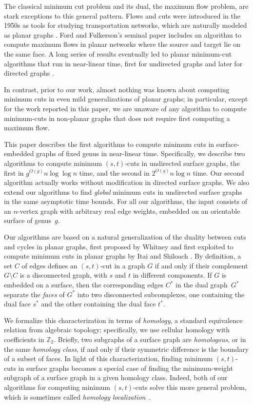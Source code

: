 \documentclass[11pt,twoside]{article}
\def\Z{\mathbb{Z}}
\begin{document}
The classical minimum cut problem and its dual, the maximum flow problem, are stark exceptions to this general pattern.  Flows and cuts were introduced in the 1950s as tools for studying transportation networks, which are naturally modeled as planar graphs \cite{hr-fmern-55}.  Ford and Fulkerson's seminal paper \cite{ff-mfn-56} includes an algorithm to compute maximum flows in planar networks where the source and target lie on the same face.  A long series of results eventually led to planar minimum-cut algorithms that run in near-linear time, first for undirected graphs \cite{r-mstcp-83, hj-oamfu-85, f-faspp-87, insw-iamcmf-11} and later for directed graphs \cite{jk-mcdpn-92, hkrs-fspap-97, mnnw-mdpgo-15}.

In contrast, prior to our work, almost nothing was known about computing minimum cuts in even mild generalizations of planar graphs; in particular, except for the work reported in this paper, we are unaware of any algorithm to compute minimum-cuts in non-planar graphs that does not require first computing a maximum flow.  

This paper describes the first algorithms to compute minimum cuts in surface-embedded graphs of fixed genus in near-linear time.  Specifically, we describe two algorithms to compute minimum $(s,t)$-cuts in undirected surface graphs, the first in $g^{O(g)} n\log\log n$ time, and the second in $2^{O(g)} n\log n$ time.  Our second algorithm actually works without modification in directed surface graphs.  We also extend our  algorithms to find \emph{global} minimum cuts in undirected surface graphs in the same asymptotic time bounds.  For all our algorithms, the input consists of an $n$-vertex graph with arbitrary real edge weights, embedded on an orientable surface of genus~$g$.

Our algorithms are based on a natural generalization of the duality between cuts and cycles in planar graphs, first proposed by Whitney \cite{w-pg-33} and first exploited to compute minimum cuts in planar graphs by Itai and Shiloach \cite{is-mfpn-79}.  By definition, a set $C$ of edges defines an $(s,t)$-cut in a graph $G$ if and only if their complement $G\setminus C$ is a disconnected graph, with $s$ and $t$ in different components.  If $G$ is embedded on a surface, then the corresponding edges $C^*$ in the dual graph~$G^*$ separate the \emph{faces} of $G^*$ into two disconnected subcomplexes, one containing the dual face $s^*$ and the other containing the dual face $t^*$. 

We formalize this characterization in terms of \emph{homology}, a standard equivalence relation from algebraic topology; specifically, we use cellular homology with coefficients in $\Z_2$.  Briefly, two subgraphs of a surface graph are \emph{homologous}, or in the same \emph{homology class}, if and only if their symmetric difference is the boundary of a subset of faces.  In light of this characterization, finding minimum $(s,t)$-cuts in surface graphs becomes a special case of finding the minimum-weight subgraph of a surface graph in a given homology class.  Indeed, both of our algorithms for computing minimum $(s,t)$-cuts solve this more general problem, which is sometimes called \emph{homology localization}~\cite{cf-qhc-08,cf-hrhl-10}.
\end{document}
